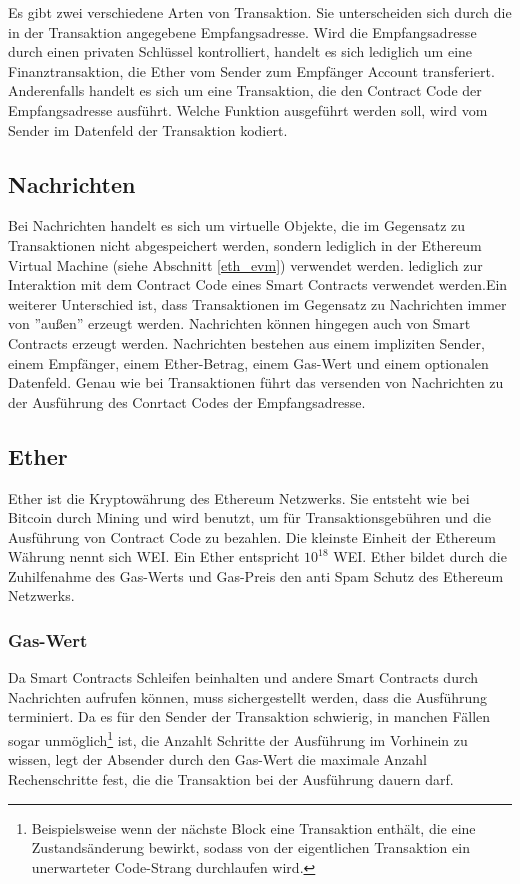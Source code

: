 Es gibt zwei verschiedene Arten von Transaktion. Sie unterscheiden sich durch die in der Transaktion angegebene Empfangsadresse. 
Wird die Empfangsadresse durch einen privaten Schlüssel kontrolliert, handelt es sich lediglich um eine Finanztransaktion, die Ether vom Sender zum Empfänger Account transferiert. Anderenfalls handelt es sich um eine Transaktion, die den Contract Code der Empfangsadresse ausführt. Welche Funktion ausgeführt werden soll, wird vom Sender im Datenfeld der Transaktion kodiert.

\subsection{Nachrichten}\label{eth_messages}
Bei Nachrichten handelt es sich um virtuelle Objekte, die im Gegensatz zu Transaktionen nicht abgespeichert werden, sondern lediglich in der Ethereum Virtual Machine (siehe Abschnitt \ref{eth_evm}) verwendet werden. \if lediglich zur Interaktion mit dem Contract Code eines Smart Contracts verwendet werden.\fi Ein weiterer Unterschied ist, dass Transaktionen im Gegensatz zu Nachrichten immer von ''außen'' erzeugt werden. Nachrichten können hingegen auch von Smart Contracts erzeugt werden. Nachrichten bestehen aus einem impliziten Sender, einem Empfänger, einem Ether-Betrag, einem Gas-Wert und einem optionalen Datenfeld. Genau wie bei Transaktionen führt das versenden von Nachrichten zu der Ausführung des Conrtact Codes der Empfangsadresse.

\subsection{Ether}\label{eth_ether} 
Ether ist die Kryptowährung des Ethereum Netzwerks. Sie entsteht wie bei Bitcoin durch Mining und wird benutzt, um für Transaktionsgebühren und die Ausführung von Contract Code zu bezahlen. Die kleinste Einheit der Ethereum Währung nennt sich WEI. Ein Ether entspricht $10^{18}$ WEI. Ether bildet durch die Zuhilfenahme des Gas-Werts und Gas-Preis den anti Spam Schutz des Ethereum Netzwerks.
\subsubsection{Gas-Wert}
Da Smart Contracts Schleifen beinhalten und andere Smart Contracts durch Nachrichten aufrufen können, muss sichergestellt werden, dass die Ausführung terminiert. Da es für den Sender der Transaktion schwierig, in manchen Fällen sogar unmöglich\footnote{Beispielsweise wenn der nächste Block eine Transaktion enthält, die eine Zustandsänderung bewirkt, sodass von der eigentlichen Transaktion ein unerwarteter Code-Strang durchlaufen wird.} ist, die Anzahlt Schritte der Ausführung im Vorhinein zu wissen, legt der Absender durch den Gas-Wert die maximale Anzahl Rechenschritte fest, die die Transaktion bei der Ausführung dauern darf.
